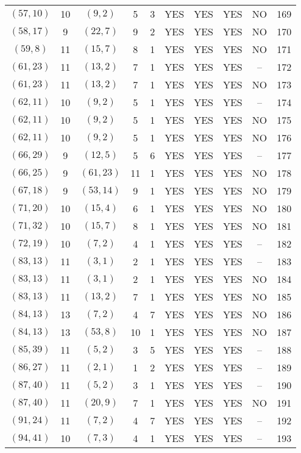 \begin{longtable}{|c|c|c|c|c|c|c|c|c|c|}
$(57, 10)$ & 10 & $(9, 2)$ & 5 & 3 & YES & YES & YES & NO & 169\\
$(58, 17)$ & 9 & $(22, 7)$ & 9 & 2 & YES & YES & YES & NO & 170\\
$(59, 8)$ & 11 & $(15, 7)$ & 8 & 1 & YES & YES & YES & NO & 171\\
$(61, 23)$ & 11 & $(13, 2)$ & 7 & 1 & YES & YES & YES & -- & 172\\
$(61, 23)$ & 11 & $(13, 2)$ & 7 & 1 & YES & YES & YES & NO & 173\\
$(62, 11)$ & 10 & $(9, 2)$ & 5 & 1 & YES & YES & YES & -- & 174\\
$(62, 11)$ & 10 & $(9, 2)$ & 5 & 1 & YES & YES & YES & NO & 175\\
$(62, 11)$ & 10 & $(9, 2)$ & 5 & 1 & YES & YES & YES & NO & 176\\
$(66, 29)$ & 9 & $(12, 5)$ & 5 & 6 & YES & YES & YES & -- & 177\\
$(66, 25)$ & 9 & $(61, 23)$ & 11 & 1 & YES & YES & YES & NO & 178\\
$(67, 18)$ & 9 & $(53, 14)$ & 9 & 1 & YES & YES & YES & NO & 179\\
$(71, 20)$ & 10 & $(15, 4)$ & 6 & 1 & YES & YES & YES & NO & 180\\
$(71, 32)$ & 10 & $(15, 7)$ & 8 & 1 & YES & YES & YES & NO & 181\\
$(72, 19)$ & 10 & $(7, 2)$ & 4 & 1 & YES & YES & YES & -- & 182\\
$(83, 13)$ & 11 & $(3, 1)$ & 2 & 1 & YES & YES & YES & -- & 183\\
$(83, 13)$ & 11 & $(3, 1)$ & 2 & 1 & YES & YES & YES & NO & 184\\
$(83, 13)$ & 11 & $(13, 2)$ & 7 & 1 & YES & YES & YES & NO & 185\\
$(84, 13)$ & 13 & $(7, 2)$ & 4 & 7 & YES & YES & YES & NO & 186\\
$(84, 13)$ & 13 & $(53, 8)$ & 10 & 1 & YES & YES & YES & NO & 187\\
$(85, 39)$ & 11 & $(5, 2)$ & 3 & 5 & YES & YES & YES & -- & 188\\
$(86, 27)$ & 11 & $(2, 1)$ & 1 & 2 & YES & YES & YES & -- & 189\\
$(87, 40)$ & 11 & $(5, 2)$ & 3 & 1 & YES & YES & YES & -- & 190\\
$(87, 40)$ & 11 & $(20, 9)$ & 7 & 1 & YES & YES & YES & NO & 191\\
$(91, 24)$ & 11 & $(7, 2)$ & 4 & 7 & YES & YES & YES & -- & 192\\
$(94, 41)$ & 10 & $(7, 3)$ & 4 & 1 & YES & YES & YES & -- & 193\\

\end{longtable}
